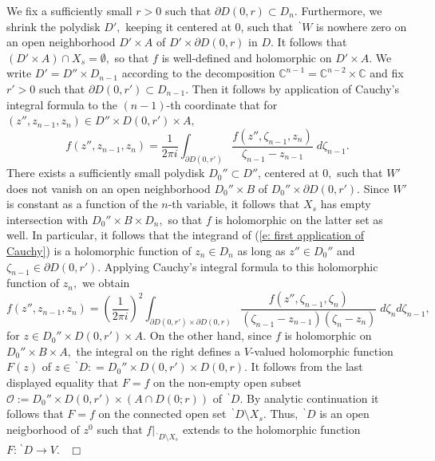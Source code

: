 \documentclass[12pt,a4paper]{article}
\def\qed{~\hfill\hbox{$\Box$}\medbreak}
\def\msy#1{{\mathbb #1}}
\def\C{{\msy C}}
\def\to{\rightarrow}
\def\cO{{\mathcal O}}
\numberwithin{Thm}{section}
\numberwithin{equation}{section}
\numberwithin{equation}{section}
\def\bp{\!{\,}^\backprime}
\begin{document}
We fix a sufficiently small $r >0$ such that $\partial D(0, r) \subset D_n.$ 
Furthermore, we shrink the polydisk $D',$ keeping it centered at $0$, such that $\bp W$ is nowhere zero on an open neighborhood $D' \times A$ of $D' \times \partial D(0, r)$ in $D.$ 
It follows that $(D'\times A)  \cap X_s = \emptyset,$ so that $f$ is well-defined and holomorphic on 
$D'\times A.$ We write $D'= D'' \times D_{n-1}$ according to the decomposition
$\C^{n-1} = \C^{n-2} \times \C$ and fix $r'> 0$ such that $\partial D(0,r') \subset D_{n-1}.$ 
Then  it follows by application of Cauchy's integral formula to the $(n-1)$-th coordinate 
that for $(z'', z_{n-1}, z_n) \in D'' \times D(0, r') \times A,$
\begin{equation}
\label{e: first application of Cauchy}
f(z'', z_{n-1}, z_n) = \frac{1}{2\pi i} \int_{\partial D(0, r') } \frac{f(z'', \zeta_{n-1}, z_n)}{\zeta_{n-1} - z_{n-1}}\; d\zeta_{n-1}.
\end{equation}
There exists a sufficiently small polydisk $D_0'' \subset D''$, centered at $0,$ such that 
$W'$ does not vanish on  an open neighborhood $D_0'' \times B$ of 
$D_0'' \times \partial D(0, r').$  Since $W'$ is constant as a function of the 
$n$-th variable, it follows that $X_s$ has empty intersection with $D_0'' \times B \times D_n,$ 
so that $f$ is holomorphic on the latter set as well. In particular, it follows that the integrand
of (\ref{e: first application of Cauchy}) is a holomorphic function of $z_n \in D_n$ as long 
as $z'' \in D_0''$ and $\zeta_{n-1} \in \partial D(0, r').$ Applying Cauchy's integral formula
to this holomorphic function of $z_n,$ we obtain
$$ 
f(z'', z_{n-1}, z_n) = \left(\frac{1}{2\pi i}\right)^2\int_{\partial D(0,r') \times \partial D(0,r)}
 \frac{f(z'', \zeta_{n-1}, \zeta_n)}{(\zeta_{n-1} - z_{n-1})(\zeta_n - z_n)}\; d\zeta_n d\zeta_{n-1},
$$%
for $z \in D_0'' \times D(0,r')  \times A.$
On the other hand, since $f$ is holomorphic on $D_0''\times B \times A,$ 
the integral on the right defines a $V$-valued holomorphic  function $F(z)$ 
of $z \in \bp D : = D_0'' \times D(0, r') \times D(0,r).$ 
It follows from the last displayed equality that $F = f$ on the non-empty open subset 
$\cO:= D_0'' \times D(0, r') \times (A\cap D(0; r))$ of $\bp D.$ 
By analytic continuation it follows that $F = f$ on the connected open set 
$\bp D\setminus X_s.$ Thus, $\bp D$ 
is an open neigborhood of $z^0$ such that 
$f|_{\bp D\setminus X_s}$ extends to the holomorphic function $F: \bp D \to V.$  
\qed 
\end{document}
